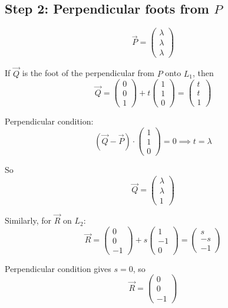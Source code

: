 \documentclass[journal]{IEEEtran}
\begin{document}
\subsection*{Step 2: Perpendicular foots from $P$}

\[
\vec{P} = \begin{pmatrix}\lambda \\ \lambda \\ \lambda \end{pmatrix} \tag{2}
\]

If $\vec{Q}$ is the foot of the perpendicular from $P$ onto $L_1$, then
\[
\vec{Q} = \begin{pmatrix}0\\0\\1\end{pmatrix} + t \begin{pmatrix}1\\1\\0\end{pmatrix} = \begin{pmatrix}t\\t\\1\end{pmatrix} \tag{3}
\]

Perpendicular condition:
\[
(\vec{Q}-\vec{P}) \cdot \begin{pmatrix}1\\1\\0\end{pmatrix} = 0 \implies t = \lambda
\]

So
\[
\vec{Q} = \begin{pmatrix}\lambda\\ \lambda \\ 1\end{pmatrix} \tag{4}
\]

Similarly, for $\vec{R}$ on $L_2$:
\[
\vec{R} = \begin{pmatrix}0\\0\\-1\end{pmatrix} + s \begin{pmatrix}1\\-1\\0\end{pmatrix} = \begin{pmatrix}s\\-s\\-1\end{pmatrix} \tag{4}
\]

Perpendicular condition gives \(s=0\), so
\[
\vec{R} = \begin{pmatrix}0\\0\\-1\end{pmatrix} 
\]
\end{document}
